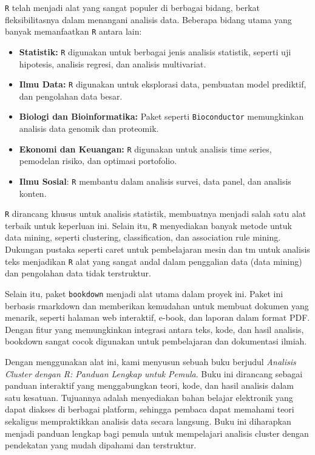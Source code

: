 \documentclass[
  oneside]{book}
\begin{document}
\texttt{R} telah menjadi alat yang sangat populer di berbagai
bidang, berkat fleksibilitasnya dalam menangani analisis data. Beberapa
bidang utama yang banyak memanfaatkan \texttt{R} antara lain:

\begin{itemize}
\item
  \textbf{Statistik:} \texttt{R} digunakan untuk berbagai jenis
  analisis statistik, seperti uji hipotesis, analisis regresi, dan
  analisis multivariat.
\item
  \textbf{Ilmu Data:} \texttt{R} digunakan untuk eksplorasi data,
  pembuatan model prediktif, dan pengolahan data besar.
\item
  \textbf{Biologi dan Bioinformatika:} Paket seperti \texttt{Bioconductor}
  memungkinkan analisis data genomik dan proteomik.
\item
  \textbf{Ekonomi dan Keuangan:} \texttt{R} digunakan untuk analisis
  time series, pemodelan risiko, dan optimasi portofolio.
\item
  \textbf{Ilmu Sosial}: \texttt{R} membantu dalam analisis survei,
  data panel, dan analisis konten.
\end{itemize}

\texttt{R} dirancang khusus untuk analisis statistik, membuatnya
menjadi salah satu alat terbaik untuk keperluan ini. Selain itu,
\texttt{R} menyediakan banyak metode untuk data mining, seperti
clustering, classification, dan association rule mining. Dukungan
pustaka seperti caret untuk pembelajaran mesin dan tm untuk analisis
teks menjadikan \texttt{R} alat yang sangat andal dalam penggalian
data (data mining) dan pengolahan data tidak terstruktur.

Selain itu, paket \texttt{bookdown} menjadi alat utama dalam proyek ini. Paket
ini berbasis rmarkdown dan memberikan kemudahan untuk membuat dokumen
yang menarik, seperti halaman web interaktif, e-book, dan laporan dalam
format PDF. Dengan fitur yang memungkinkan integrasi antara teks, kode,
dan hasil analisis, bookdown sangat cocok digunakan untuk pembelajaran
dan dokumentasi ilmiah.

Dengan menggunakan alat ini, kami menyusun sebuah buku berjudul
\emph{Analisis Cluster dengan R: Panduan Lengkap untuk Pemula}. Buku ini
dirancang sebagai panduan interaktif yang menggabungkan teori, kode, dan
hasil analisis dalam satu kesatuan. Tujuannya adalah menyediakan bahan
belajar elektronik yang dapat diakses di berbagai platform, sehingga
pembaca dapat memahami teori sekaligus mempraktikkan analisis data
secara langsung. Buku ini diharapkan menjadi panduan lengkap bagi pemula
untuk mempelajari analisis cluster dengan pendekatan yang mudah dipahami
dan terstruktur.
\end{document}
